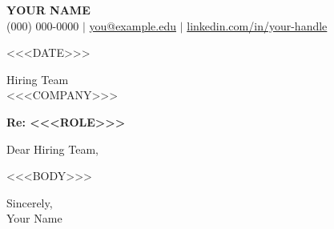\documentclass[a4paper,10pt]{article}
\begin{document}
\begin{center}
    {\Huge \textbf{YOUR NAME}} \\ \vspace{4pt}
    (000) 000-0000 $|$ \href{mailto:you@example.edu}{you@example.edu} $|$ \href{https://linkedin.com/in/your-handle}{linkedin.com/in/your-handle}
\end{center}

\vspace{10pt}

<<<DATE>>>

\vspace{2pt}

Hiring Team \\
<<<COMPANY>>>

\vspace{4pt}

\textbf{Re: <<<ROLE>>>}

\vspace{4pt}

Dear Hiring Team,

<<<BODY>>>

\vspace{6pt}

Sincerely, \\
Your Name
\end{document}
